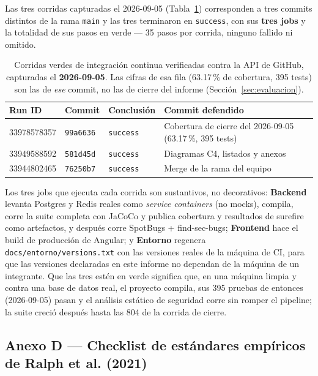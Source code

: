 Las tres corridas capturadas el 2026-09-05 (Tabla~\ref{tab:ci-runs}) corresponden a tres commits
distintos de la rama \texttt{main} y las tres terminaron en \texttt{success}, con sus \textbf{tres jobs}
y la totalidad de sus pasos en verde --- 35 pasos por corrida, ninguno fallido ni omitido.

\begin{table}[H]
\centering
\small
\begin{tabular}{p{2.6cm}p{1.7cm}p{2.2cm}p{6.4cm}}
\toprule
\textbf{Run ID} & \textbf{Commit} & \textbf{Conclusión} & \textbf{Commit defendido} \\
\midrule
33978578357 & \texttt{99a6636} & \texttt{success} & Cobertura de cierre del 2026-09-05 (63.17\,\%, 395 tests) \\
33949588592 & \texttt{581d45d} & \texttt{success} & Diagramas C4, listados y anexos \\
33944802465 & \texttt{76250b7} & \texttt{success} & Merge de la rama del equipo \\
\bottomrule
\end{tabular}
\caption[Corridas verdes de integración continua]{Corridas verdes de integración continua
verificadas contra la API de GitHub, capturadas el \textbf{2026-09-05}. Las cifras de esa fila
(63.17\,\% de cobertura, 395 tests) son las de \emph{ese} commit, no las de cierre del informe
(Sección~\ref{sec:evaluacion}).}
\label{tab:ci-runs}
\end{table}

Los tres jobs que ejecuta cada corrida son sustantivos, no decorativos: \textbf{Backend} levanta
Postgres y Redis reales como \textit{service containers} (no mocks), compila, corre la suite completa
con JaCoCo y publica cobertura y resultados de surefire como artefactos, y después corre SpotBugs +
find-sec-bugs; \textbf{Frontend} hace el build de producción de Angular; y \textbf{Entorno} regenera
\texttt{docs/entorno/versions.txt} con las versiones reales de la máquina de CI, para que las versiones
declaradas en este informe no dependan de la máquina de un integrante. Que las tres estén en verde
significa que, en una máquina limpia y contra una base de datos real, el proyecto compila, sus 395
pruebas de entonces (2026-09-05) pasan y el análisis estático de seguridad corre sin romper el
pipeline; la suite creció después hasta las 804 de la corrida de cierre.

\subsection{Anexo D --- Checklist de estándares empíricos de Ralph et al. (2021)}
\label{anexo:ralph}

